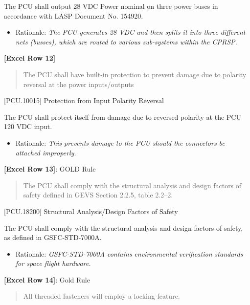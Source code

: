 The PCU shall output 28 VDC Power nominal on three power buses in accordance with LASP Document No. 154920.

\begin{itemize}
\item{} Rationale: \emph{The PCU generates 28 VDC and then splits it into three different nets (busses), which are routed to various sub-systems within the CPRSP.}

\end{itemize}

\textbf{[Excel Row 12]}

\begin{quote}
The PCU shall have built-in protection to prevent damage due to polarity reversal at the power inputs\slash outputs
\end{quote}

[PCU.10015] Protection from Input Polarity Reversal

The PCU shall protect itself from damage due to reversed polarity at the PCU 120 VDC input.

\begin{itemize}
\item{} Rationale: \emph{This prevents damage to the PCU should the connectors be attached improperly.}

\end{itemize}

\textbf{[Excel Row 13]}: GOLD Rule

\begin{quote}
The PCU shall comply with the structural analysis and design factors of safety defined in GEVS Section 2.2.5, table 2.2--2.
\end{quote}

[PCU.18200] Structural Analysis\slash Design Factors of Safety

The PCU shall comply with the structural analysis and design factors of safety, as defined in GSFC-STD-7000A.

\begin{itemize}
\item{} Rationale: \emph{GSFC-STD-7000A contains environmental verification standards for space flight hardware.}

\end{itemize}

\textbf{[Excel Row 14]}: Gold Rule

\begin{quote}
All threaded fasteners will employ a locking feature.
\end{quote}

